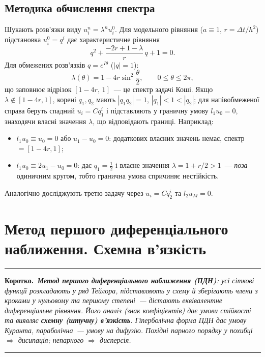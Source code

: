\documentclass[12pt,a4paper]{article}
\theoremstyle{definition}
\theoremstyle{plain}
\newenvironment{korotko}
  {\par\medskip\noindent\begingroup\color{accent!75!black}\rule{\linewidth}{0.4pt}\par
   \noindent\textbf{Коротко.}\itshape\,}
  {\par\noindent\rule{\linewidth}{0.4pt}\endgroup\medskip}
\newcommand{\abs}[1]{\left\lvert #1 \right\rvert}
\begin{document}
\subsection{Методика обчислення спектра}
Шукають розв'язки виду $u_i^n=\lambda^n u_i^0$. Для модельного рівняння
($a\equiv1$, $r=\Delta t/h^2$) підстановка $u_i^0=q^i$ дає
характеристичне рівняння
\begin{equation}
  q^2+\frac{-2r+1-\lambda}{r}\,q+1=0 .
\end{equation}
Для обмежених розв'язків $q=e^{I\theta}$ ($\abs{q}=1$):
\begin{equation}
  \lambda(\theta)=1-4r\sin^2\frac{\theta}{2},\qquad 0\le\theta\le2\pi,
\end{equation}
що заповнює відрізок $[1-4r,\,1]$~--- це спектр задачі Коші. Якщо
$\lambda\notin[1-4r,1]$, корені $q_1,q_2$ мають $\abs{q_1 q_2}=1$,
$\abs{q_1}<1<\abs{q_2}$; для напівобмеженої справа беруть спадний
$u_i=Cq_1^i$ і підставляють у граничну умову $l_1 u_0=0$, знаходячи
власні значення $\lambda$, що відповідають границі. Наприклад:
\begin{itemize}[leftmargin=1.4em]
  \item $l_1 u_0\equiv u_0=0$ або $u_1-u_0=0$: додаткових власних значень
  немає, спектр $=[1-4r,1]$;
  \item $l_1 u_0\equiv 2u_1-u_0=0$: дає $q_1=\tfrac12$ і власне значення
  $\lambda=1+r/2>1$~--- \emph{поза} одиничним кругом, тобто гранична умова
  спричиняє нестійкість.
\end{itemize}
Аналогічно досліджують третю задачу через $u_i=Cq_2^i$ та $l_2 u_M=0$.

\newpage
\section{Метод першого диференціального наближення. Схемна в'язкість}

\begin{korotko}
\textbf{Метод першого диференціального наближення (ПДН)}: усі сіткові
функції розкладають у ряд Тейлора, підставляють у схему й зберігають
члени з кроками у нульовому та першому степені~--- дістають
\emph{еквівалентне} диференціальне рівняння. Його аналіз (знак
коефіцієнтів) дає умови стійкості та виявляє \textbf{схемну (штучну)
в'язкість}. \emph{Гіперболічна} форма ПДН дає умову Куранта,
\emph{параболічна}~--- умову на дифузію. Похідні \emph{парного} порядку
у похибці $\Rightarrow$ \emph{дисипація}; \emph{непарного} $\Rightarrow$
\emph{дисперсія}.
\end{korotko}
\end{document}
